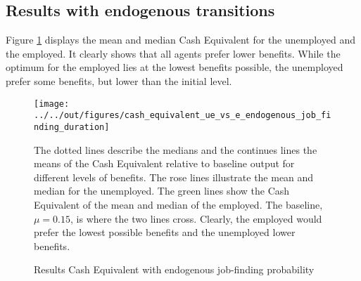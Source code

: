\documentclass[a4paper,11pt]{article}
\begin{document}
\subsection{Results with endogenous transitions}


Figure \ref{cash_equivalent_ue_vs_e} displays the mean and median Cash Equivalent for the unemployed and the employed. It clearly shows that all agents prefer lower benefits. While the optimum for the employed lies at the lowest benefits possible, the unemployed prefer some benefits, but lower than the initial level. 

\begin{figure}
\caption{Results Cash Equivalent with endogenous job-finding probability} 
\label{cash_equivalent_ue_vs_e}	%
\centering
\texttt{[image: ../../out/figures/cash\_equivalent\_ue\_vs\_e\_endogenous\_job\_finding\_duration]}

\begin{minipage}{0.8\linewidth}
\footnotesize{The dotted lines describe the medians and the continues lines the means of the Cash Equivalent relative to baseline output for different levels of benefits. The rose lines illustrate the mean and median for the unemployed. The green lines show the Cash Equivalent of the mean and median of the employed. The baseline, $\mu = 0.15$, is where the two lines cross. Clearly, the employed would prefer the lowest possible benefits and the unemployed lower benefits. }
\end{minipage}

\end{figure}
\end{document}
